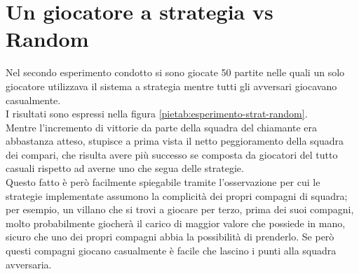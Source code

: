 \section{Un giocatore a strategia vs Random}

Nel secondo esperimento condotto si sono giocate 50 partite nelle quali un solo giocatore utilizzava il sistema a strategia mentre tutti gli avversari giocavano casualmente.\\
I risultati sono espressi nella figura \ref{pietab:esperimento-strat-random}.\\
Mentre l'incremento di vittorie da parte della squadra del chiamante era abbastanza atteso, stupisce a prima vista il netto peggioramento della squadra dei compari, che risulta avere più successo se composta da giocatori del tutto casuali rispetto ad averne uno che segua delle strategie.\\
Questo fatto è però facilmente spiegabile tramite l'osservazione per cui le strategie implementate assumono la complicità dei propri compagni di squadra; per esempio, un villano che si trovi a giocare per terzo, prima dei suoi compagni, molto probabilmente giocherà il carico di maggior valore che possiede in mano, sicuro che uno dei propri compagni abbia la possibilità di prenderlo.
Se però questi compagni giocano casualmente è facile che lascino i punti alla squadra avversaria.


